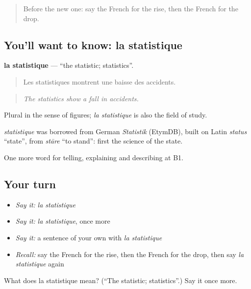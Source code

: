 \label{lesson:FR-C286-statistique}



\begin{quote}
Before the new one: say the French for the rise, then the French for the drop.
\end{quote}

\subsection*{You'll want to know: la statistique}
\textbf{la statistique} — \textquotedblleft{}the statistic; statistics\textquotedblright{}.

\begin{quote}
Les statistiques montrent une baisse des accidents.
\end{quote}

\begin{quote}
\emph{The statistics show a fall in accidents.}
\end{quote}

Plural in the sense of figures; \emph{la statistique} is also the field of study.

\begin{cousinweb}
\emph{statistique} was borrowed from German \emph{Statistik} (EtymDB), built on Latin \emph{status} \textquotedblleft{}state\textquotedblright{}, from \emph{stāre} \textquotedblleft{}to stand\textquotedblright{}: first the science of the state.
\end{cousinweb}

\begin{grammarlens}[title={What you've built}]
One more word for telling, explaining and describing at B1.
\end{grammarlens}

\subsection*{Your turn}
\begin{itemize}
\raggedright
  \item \emph{Say it:} \emph{la statistique}
  \item \emph{Say it:} \emph{la statistique}, once more
  \item \emph{Say it:} a sentence of your own with \emph{la statistique}
  \item \emph{Recall:} say the French for the rise, then the French for the drop, then say \emph{la statistique} again
\end{itemize}

\begin{tcolorbox}[breakable,colback=teal!4,colframe=teal!35!black,title={Before you move on}]
What does la statistique mean? (\textquotedblleft{}The statistic; statistics\textquotedblright{}.) Say it once more.
\end{tcolorbox}
